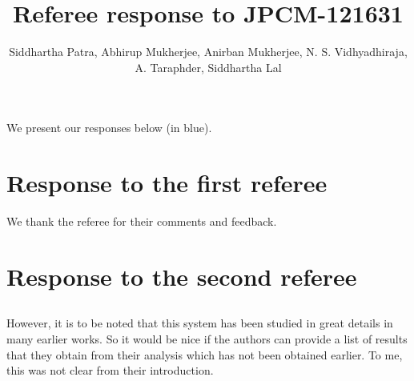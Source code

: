 \documentclass{article}
\title{Referee response to JPCM-121631}
\author{Siddhartha Patra, Abhirup Mukherjee, Anirban Mukherjee, N. S. Vidhyadhiraja,\\ A. Taraphder, Siddhartha Lal}
\newcommand{\point}[1]{\subsection{}{#1}}
\begin{document}
\maketitle

\flushleft
We present our responses below (in blue).

\section*{Response to the first referee}
{\color{blue}We thank the referee for their comments and feedback.}

\section*{Response to the second referee}
\point{
However, it is to be noted that this system has been studied in great details in many earlier works. So it would be nice if the authors can provide a list of results that they obtain from their analysis which has not been obtained earlier. To me, this was not clear from their introduction.}
\end{document}
